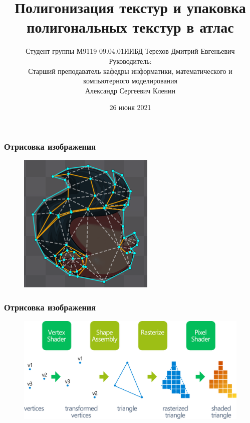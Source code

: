\documentclass[10pt, unicode]{beamer}
\title{Полигонизация текстур и упаковка полигональных текстур в атлас}
\author[Терехов Д.Е.]{Студент группы М9119-09.04.01ИИБД Терехов Дмитрий Евгеньевич\\
Руководитель:\\
Старший преподаватель кафедры информатики, математического и компьютерного моделирования\\
Александр Сергеевич Кленин}
\date{26 июня 2021}
\begin{document}
    \begin{frame}[fragile]
        \titlepage
        \thispagestyle{empty}
    \end{frame}
    \begin{frame}
        \frametitle{Отрисовка изображения}
        \begin{figure}[H]
            \centering
            \includegraphics[scale=0.6]{spine_mesh.png}
        \end{figure}
    \end{frame}
    \begin{frame}
        \frametitle{Отрисовка изображения}
        \begin{figure}[H]
            \centering
            \includegraphics[scale=0.5]{graphicspipeline.png}
        \end{figure}
    \end{frame}
\end{document}
